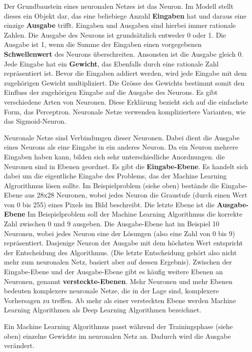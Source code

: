 Der Grundbaustein eines neuronalen Netzes ist das Neuron. Im Modell stellt
dieses ein Objekt dar, das eine beliebiege Anzahl \textbf{Eingaben} hat und
daraus eine einzige \textbf{Ausgabe} trifft. Eingaben und Ausgaben sind hierbei
immer rationale Zahlen. Die Ausgabe des Neurons ist grundsätzlich entweder 0
oder 1. Die Ausgabe ist 1, wenn die Summe der Eingaben einen vorgegebenen
\textbf{Schwellenwert} des Neurons überschreiten. Ansonsten ist die Ausgabe
gleich 0. Jede Eingabe hat ein \textbf{Gewicht}, das Ebenfalls durch eine
rationale Zahl repräsentiert ist. Bevor die Eingaben addiert werden, wird jede
Eingabe mit dem zugehörigen Gewicht multipliziert. Die Grösse des Gewichts
bestimmt somit den Einfluss der zugehörigen Eingabe auf die Ausgabe des Neurons.
Es gibt verschiedene Arten von Neuronen. Diese Erklärung bezieht sich auf die
einfachste Form, das Perceptron. Neuronale Netze verwenden kompliziertere
Varianten, wie das Sigmoid-Neuron. 

Neuronale Netze sind Verbindungen dieser Neuronen. Dabei dient die Ausgabe eines
Neurons als eine Eingabe in ein anderes Neuron. Da ein Neuron mehrere Eingaben
haben kann, bilden sich sehr unterschiedliche Anordnungen. die Neuronen sind in
Ebenen geordnet. Es gibt die \textbf{Eingabe-Ebene}. Es handelt sich dabei um
die eigentliche Eingabe des Problems, das der Machine Learning Algrorithmus
lösen sollte. Im Beispielproblem (siehe oben) bestände die Eingabe-Ebene aus
28x28 Neuronen, wobei jedes Neuron die Graustufe (durch einen Wert von 0 bis
255) eines Pixels im Bild beschreibt. Die letzte Ebene ist die
\textbf{Ausgabe-Ebene} Im Beispielproblem soll der Machine Learning Algorithmus
die korrekte Zahl zwischen 0 und 9 ausgeben. Die Ausgabe-Ebene hat im Beispiel
10 Neuronen, wobei jedes Neuron eine der Lösungen (also eine Zahl von 0 bis 9)
repräsentiert. Dasjenige Neuron der Ausgabe mit dem höchsten Wert entspricht der
Entscheidung des Algorithmus. (Die letzte Entscheidung gehört also nicht mehr
zum neuronalen Netz, basiert aber auf dessen Ergebnis). Zwischen der
Eingabe-Ebene und der Ausgabe-Ebene gibt es häufig weitere Ebenen an Neuronen,
genannt \textbf{versteckte-Ebenen}. Mehr Neuronen und mehr Ebenen bedeuten
komplexere neuronale Netze, die in der Lage sind, komplexere Vorhersagen zu
treffen. Ab mehr als einer versteckten Ebene werden Machine Learning Algorithmen
als Deep Learning Algorithmen bezeichnet.

Ein Machine Learning Algorithmus passt während der Trainingsphase (siehe oben)
einzelne Gewichte im neuronalen Netz an. Dadurch wird die Ausgabe verändert. 


